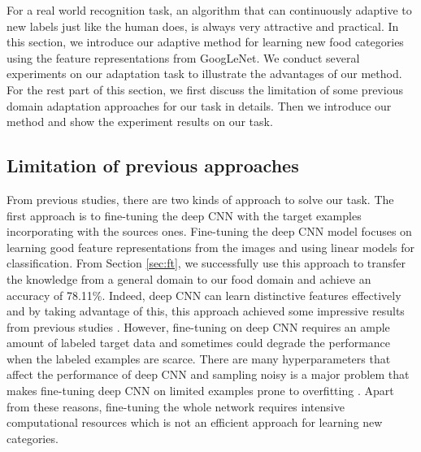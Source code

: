 ﻿For a real world recognition task, an algorithm that can continuously adaptive to new labels just like the human does, is always very attractive and practical.
In this section, we introduce our adaptive method for learning new food categories using the feature representations from GoogLeNet.
We conduct several experiments on our adaptation task to illustrate the advantages of our method.
For the rest part of this section, we first discuss the limitation of some previous domain adaptation approaches for our task in details. Then we introduce our method and show the experiment results on our task.

\subsection{Limitation of previous approaches}
From previous studies, there are two kinds of approach to solve our task. The first approach is to fine-tuning the deep CNN with the target examples incorporating with the sources ones.
Fine-tuning the deep CNN model focuses on learning good feature representations from the images and using linear models for classification. From Section \ref{sec:ft}, we successfully use this approach to transfer the knowledge from a general domain to our food domain and achieve an accuracy of 78.11\%. Indeed, deep CNN can learn distinctive features effectively and by taking advantage of this, this approach achieved some impressive results from previous studies\cite{Chatfield14} \cite{zeiler2014visualizing}. However, fine-tuning on deep CNN requires an ample amount of labeled target data and sometimes could degrade the performance when the labeled examples are scarce\cite{hoffman2013one}. There are many hyperparameters that affect the performance of deep CNN and sampling noisy is a major problem that makes fine-tuning deep CNN on limited examples prone to overfitting \cite{srivastava2014dropout}. Apart from these reasons, fine-tuning the whole network requires intensive computational resources which is not an efficient approach for learning new categories.

